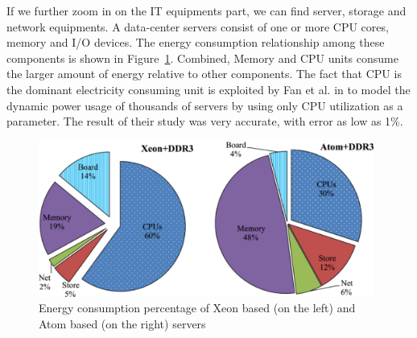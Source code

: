 If we further zoom in on the IT equipments part, we can find server, storage and network equipments. A data-center servers consist of one or more CPU cores, memory and I/O devices. The energy consumption relationship among these components is shown in Figure~\ref{fig:serverenergy}. Combined, Memory and CPU units consume the larger amount of energy relative to other components. The fact that CPU is the dominant electricity consuming unit is exploited by Fan et al. in \cite{DBLP:conf/isca/FanWB07} to model the dynamic power usage of thousands of servers by using only CPU utilization as a parameter. The result of their study was very accurate, with error as low as 1\%. 
\begin{figure}[ht]
	\begin{center}
		\includegraphics[width=11cm]{images/serverenergy.pdf}
		\caption{Energy consumption percentage of Xeon based (on the left) and Atom based (on the right) servers \cite{DBLP:journals/comsur/DayarathnaWF16}}
		\label{fig:serverenergy}
	\end{center}
\end{figure}
